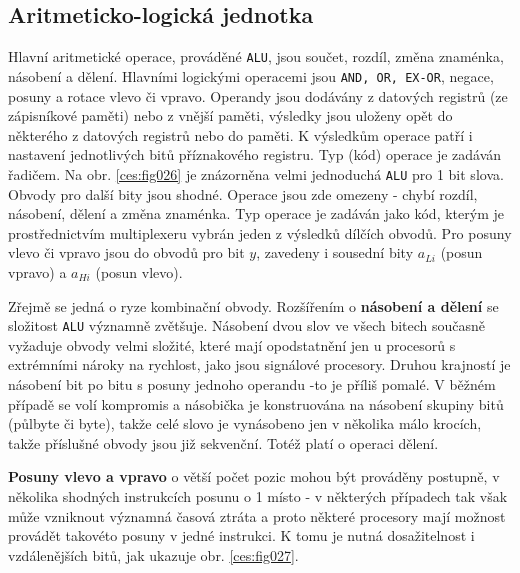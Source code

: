     \subsection{Aritmeticko-logická jednotka}\label{ces:IchapIVsecIIssecII}
      Hlavní aritmetické operace, prováděné \texttt{ALU}, jsou součet, rozdíl, změna znaménka, 
      násobení a dělení. Hlavními logickými operacemi jsou \texttt{AND, OR, EX-OR}, negace, posuny 
      a rotace vlevo či vpravo. Operandy jsou dodávány z datových registrů (ze zápisníkové paměti) 
      nebo z vnější paměti, výsledky jsou uloženy opět do některého z datových registrů nebo do 
      paměti. K výsledkům operace patří i nastavení jednotlivých bitů příznakového registru. Typ 
      (kód) operace je zadáván řadičem. Na obr. \ref{ces:fig026} je znázorněna velmi jednoduchá 
      \texttt{ALU} pro 1 bit slova. Obvody pro další bity jsou shodné. Operace jsou zde omezeny - 
      chybí rozdíl, násobení, dělení a změna znaménka. Typ operace je zadáván jako kód, kterým je 
      prostřednictvím multiplexeru vybrán jeden z výsledků dílčích obvodů. Pro posuny vlevo či 
      vpravo jsou do obvodů pro bit \(y\), zavedeny i sousední bity \(a_{Li}\) (posun vpravo) 
      a \(a_{Hi}\) (posun vlevo).


       Zřejmě se jedná o ryze kombinační obvody. Rozšířením o \textbf{násobení a dělení} se 
       složitost \texttt{ALU} významně zvětšuje. Násobení dvou slov ve všech bitech současně 
       vyžaduje obvody velmi složité, které mají opodstatnění jen u procesorů s extrémními nároky 
       na rychlost, jako jsou signálové procesory. Druhou krajností je násobení bit po bitu s 
       posuny jednoho operandu -to je příliš pomalé. V běžném případě se volí kompromis a násobička 
       je konstruována na násobení skupiny bitů (půlbyte či byte), takže celé slovo je vynásobeno 
       jen v několika málo krocích, takže příslušné obvody jsou již sekvenční. Totéž platí o 
       operaci dělení.
       
       \textbf{Posuny vlevo a vpravo} o větší počet pozic mohou být prováděny postupně, v několika 
       shodných instrukcích posunu o 1 místo - v některých případech tak však může vzniknout 
       významná časová ztráta a proto některé procesory mají možnost provádět takovéto posuny v 
       jedné instrukci. K tomu je nutná dosažitelnost i vzdálenějších bitů, jak ukazuje obr. 
       \ref{ces:fig027}.
               

